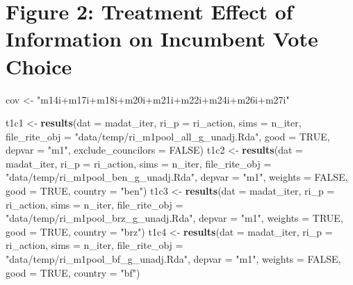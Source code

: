 \documentclass[]{article}
\newenvironment{Shaded}{\begin{snugshade}}{\end{snugshade}}
\newcommand{\KeywordTok}[1]{\textcolor[rgb]{0.13,0.29,0.53}{\textbf{{#1}}}}
\newcommand{\DataTypeTok}[1]{\textcolor[rgb]{0.13,0.29,0.53}{{#1}}}
\newcommand{\StringTok}[1]{\textcolor[rgb]{0.31,0.60,0.02}{{#1}}}
\newcommand{\OtherTok}[1]{\textcolor[rgb]{0.56,0.35,0.01}{{#1}}}
\newcommand{\NormalTok}[1]{{#1}}
\begin{document}
\section{Figure 2: Treatment Effect of Information on Incumbent Vote
Choice}\label{figure-2-treatment-effect-of-information-on-incumbent-vote-choice}

\begin{Shaded}
\begin{Highlighting}[]
  \NormalTok{cov <-}\StringTok{ "m14i+m17i+m18i+m20i+m21i+m22i+m24i+m26i+m27i"}

  \NormalTok{t1c1 <-}\StringTok{  }\KeywordTok{results}\NormalTok{(}\DataTypeTok{dat =} \NormalTok{madat_iter, }\DataTypeTok{ri_p =} \NormalTok{ri_action, }\DataTypeTok{sims =} \NormalTok{n_iter,}
                  \DataTypeTok{file_rite_obj =} \StringTok{"data/temp/ri_m1pool_all_g_unadj.Rda"}\NormalTok{,}
                  \DataTypeTok{good =} \OtherTok{TRUE}\NormalTok{, }\DataTypeTok{depvar =} \StringTok{"m1"}\NormalTok{, }\DataTypeTok{exclude_councilors =} \OtherTok{FALSE}\NormalTok{)}
  \NormalTok{t1c2 <-}\StringTok{ }\KeywordTok{results}\NormalTok{(}\DataTypeTok{dat =} \NormalTok{madat_iter, }\DataTypeTok{ri_p =} \NormalTok{ri_action, }\DataTypeTok{sims =} \NormalTok{n_iter,}
                  \DataTypeTok{file_rite_obj =} \StringTok{"data/temp/ri_m1pool_ben_g_unadj.Rda"}\NormalTok{,}
                  \DataTypeTok{depvar =} \StringTok{"m1"}\NormalTok{, }\DataTypeTok{weights =} \OtherTok{FALSE}\NormalTok{, }\DataTypeTok{good =} \OtherTok{TRUE}\NormalTok{, }\DataTypeTok{country =} \StringTok{"ben"}\NormalTok{)}
  \NormalTok{t1c3 <-}\StringTok{ }\KeywordTok{results}\NormalTok{(}\DataTypeTok{dat =} \NormalTok{madat_iter, }\DataTypeTok{ri_p =} \NormalTok{ri_action, }\DataTypeTok{sims =} \NormalTok{n_iter,}
                  \DataTypeTok{file_rite_obj =} \StringTok{"data/temp/ri_m1pool_brz_g_unadj.Rda"}\NormalTok{,}
                  \DataTypeTok{depvar =} \StringTok{"m1"}\NormalTok{, }\DataTypeTok{weights =} \OtherTok{TRUE}\NormalTok{,  }\DataTypeTok{good =} \OtherTok{TRUE}\NormalTok{, }\DataTypeTok{country =} \StringTok{"brz"}\NormalTok{)}
  \NormalTok{t1c4 <-}\StringTok{ }\KeywordTok{results}\NormalTok{(}\DataTypeTok{dat =} \NormalTok{madat_iter, }\DataTypeTok{ri_p =} \NormalTok{ri_action, }\DataTypeTok{sims =} \NormalTok{n_iter,}
                  \DataTypeTok{file_rite_obj =} \StringTok{"data/temp/ri_m1pool_bf_g_unadj.Rda"}\NormalTok{,}
                  \DataTypeTok{depvar =} \StringTok{"m1"}\NormalTok{, }\DataTypeTok{weights =} \OtherTok{FALSE}\NormalTok{, }\DataTypeTok{good =} \OtherTok{TRUE}\NormalTok{, }\DataTypeTok{country =} \StringTok{"bf"}\NormalTok{)}

\end{Highlighting}
\end{Shaded}
\end{document}
